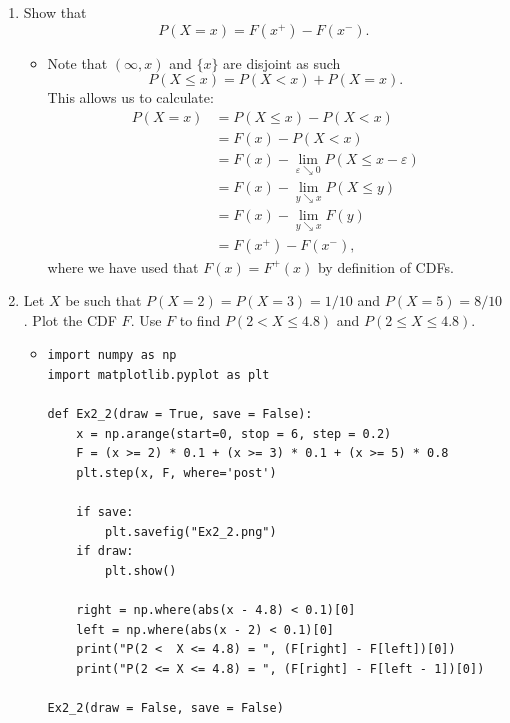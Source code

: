 \documentclass{article}
\begin{document}
\begin{enumerate}
	\item Show that
	$$
	P(X = x) = F(x^+) - F(x^-).
	$$
		\begin{itemize}
			\item Note that $(\infty, x)$ and $\{x\}$ are disjoint as such
			$$
			P(X \leq x) = P(X < x) + P(X = x).
			$$
			This allows us to calculate:
			$$
			\begin{aligned}
			P(X = x) &= P(X \leq x) - P(X < x) \\
			&= F(x) - P(X < x) \\
			&= F(x) - \lim_{\varepsilon \searrow 0} P(X \leq x - \varepsilon) \\
			&= F(x) - \lim_{y \searrow x} P(X \leq y) \\
			&= F(x) - \lim_{y \searrow x} F(y) \\
			&= F(x^+) - F(x^-),
			\end{aligned}
			$$
			where we have used that $F(x) = F^+(x)$ by definition of CDFs.
		\end{itemize}
	\item Let $X$ be such that $P(X = 2) = P(X = 3) = 1 / 10$ and $P(X = 5) = 8 / 10$. Plot the CDF $F$. Use $F$ to find $P(2 < X \leq 4.8)$ and $P(2 \leq X \leq 4.8)$.
		\begin{itemize}
			\item
			\begin{verbatim}
import numpy as np
import matplotlib.pyplot as plt

def Ex2_2(draw = True, save = False):
    x = np.arange(start=0, stop = 6, step = 0.2)
    F = (x >= 2) * 0.1 + (x >= 3) * 0.1 + (x >= 5) * 0.8
    plt.step(x, F, where='post')

    if save:
        plt.savefig("Ex2_2.png")
    if draw:
        plt.show()

    right = np.where(abs(x - 4.8) < 0.1)[0]
    left = np.where(abs(x - 2) < 0.1)[0]
    print("P(2 <  X <= 4.8) = ", (F[right] - F[left])[0])
    print("P(2 <= X <= 4.8) = ", (F[right] - F[left - 1])[0])

Ex2_2(draw = False, save = False)


\end{verbatim}
\end{itemize}
\end{enumerate}
\end{document}

